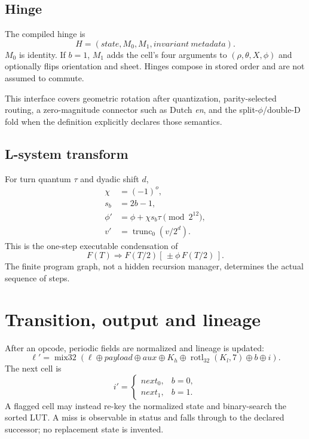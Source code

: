 \documentclass[11pt,a4paper]{article}
\begin{document}
\subsection{Hinge}
The compiled hinge is
\begin{equation}
H=(state,M_0,M_1,invariant\ metadata).
\end{equation}
$M_0$ is identity. If $b=1$, $M_1$ adds the cell's four arguments to $(\rho,\theta,X,\phi)$ and optionally flips orientation and sheet. Hinges compose in stored order and are not assumed to commute.

This interface covers geometric rotation after quantization, parity-selected routing, a zero-magnitude connector such as Dutch \emph{en}, and the split-$\phi$/double-D fold when the definition explicitly declares those semantics.

\subsection{L-system transform}
For turn quantum $\tau$ and dyadic shift $d$,
\begin{align}
\chi&=(-1)^o,\\
s_b&=2b-1,\\
\phi'&=\phi+\chi s_b\tau\pmod{2^{12}},\\
v'&=\operatorname{trunc}_0(v/2^d).
\end{align}
This is the one-step executable condensation of
\begin{equation}
F(T)\Rightarrow F(T/2)[\,\pm\phi\,F(T/2)\,].
\end{equation}
The finite program graph, not a hidden recursion manager, determines the actual sequence of steps.

\section{Transition, output and lineage}

After an opcode, periodic fields are normalized and lineage is updated:
\begin{equation}
\ell'=\operatorname{mix32}(\ell\oplus payload\oplus aux\oplus K_h\oplus\operatorname{rotl}_{32}(K_l,7)\oplus b\oplus i).
\end{equation}
The next cell is
\begin{equation}
i'=\begin{cases}next_0,&b=0,\\next_1,&b=1.\end{cases}
\end{equation}
A flagged cell may instead re-key the normalized state and binary-search the sorted LUT. A miss is observable in status and falls through to the declared successor; no replacement state is invented.
\end{document}
